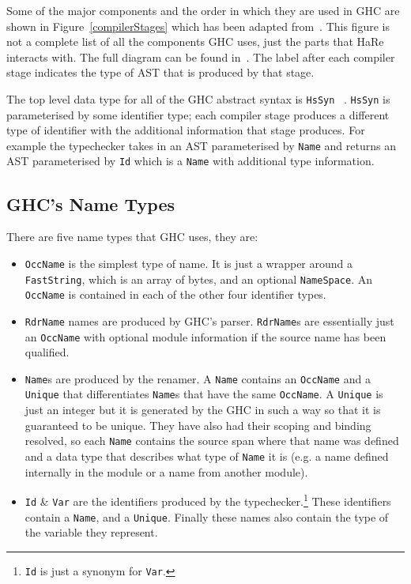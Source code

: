 Some of the major components and the order in which they are used in GHC are shown in Figure~\ref{compilerStages} which has been adapted from~\citep{ghcDesign}. This figure is not a complete list of all the components GHC uses, just the parts that HaRe interacts with. The full diagram can be found in~\citep{ghcDesign}. The label after each compiler stage indicates the type of AST that is produced by that stage.

The top level data type for all of the GHC abstract syntax is \texttt{HsSyn} ~\citep{ghcDesign}. \texttt{HsSyn} is parameterised by some identifier type; each compiler stage produces a different type of identifier with the additional information that stage produces. For example the typechecker takes in an AST parameterised by \texttt{Name} and returns an AST parameterised by \texttt{Id} which is a \texttt{Name} with additional type information.

\subsection{GHC's Name Types}\label{ghcNames}

There are five name types that GHC uses, they are:

\begin{itemize}
	\item \texttt{OccName} is the simplest type of name. It is just a wrapper around a \texttt{FastString}, which is an array of bytes, and an optional \texttt{NameSpace}. An \texttt{OccName} is contained in each of the other four identifier types.
	\item \texttt{RdrName} names are produced by GHC's parser. \texttt{RdrName}s are essentially just an \texttt{OccName} with optional module information if the source name has been qualified. 
	\item \texttt{Name}s are produced by the renamer. A \texttt{Name} contains an \texttt{OccName} and a \texttt{Unique} that differentiates \texttt{Name}s that have the same \texttt{OccName}. A \texttt{Unique} is just an integer but it is generated by the GHC in such a way so that it is guaranteed to be unique. They have also had their scoping and binding resolved, so each \texttt{Name} contains the source span where that name was defined and a data type that describes what type of \texttt{Name} it is (e.g. a name defined internally in the module or a name from another module).
	\item \texttt{Id} \& \texttt{Var} are the identifiers produced by the typechecker.\footnote{\texttt{Id} is just a synonym for \texttt{Var}.} These identifiers contain a \texttt{Name}, and a \texttt{Unique}. Finally these names also contain the type of the variable they represent. 
\end{itemize}


